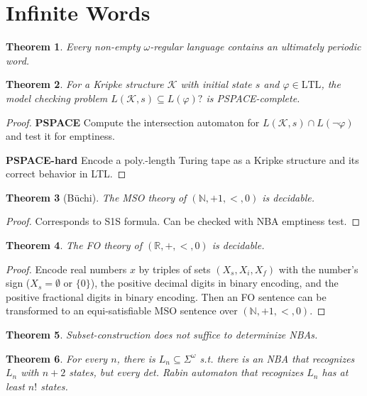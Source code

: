 \documentclass{article}
\newtheorem{theorem}{Theorem}[section]
\begin{document}
\section{Infinite Words}

\begin{theorem}
	Every non-empty $\omega$-regular language contains an ultimately periodic word.
\end{theorem}


\begin{theorem}
	For a Kripke structure $\mathcal{K}$ with initial state $s$ and $\varphi \in \text{LTL}$, the model checking problem $L(\mathcal{K}, s) \subseteq L(\varphi)?$ is PSPACE-complete.
\end{theorem}
\begin{proof}
	\textbf{PSPACE} Compute the intersection automaton for $L(\mathcal{K}, s) \cap L(\neg \varphi)$ and test it for emptiness.
	
	\textbf{PSPACE-hard} Encode a poly.-length Turing tape as a Kripke structure and its correct behavior in LTL.
\end{proof}

\begin{theorem}[Büchi]
	The MSO theory of $(\mathbb{N}, +1, <, 0)$ is decidable.
\end{theorem}
\begin{proof}
	Corresponds to S1S formula. Can be checked with NBA emptiness test.
\end{proof}

\begin{theorem}
	The FO theory of $(\mathbb{R}, +, <, 0)$ is decidable.
\end{theorem}
\begin{proof}
	Encode real numbers $x$ by triples of sets $(X_s, X_i, X_f)$ with the number's sign ($X_s = \emptyset$ or $\{0\}$), the positive decimal digits in binary encoding, and the positive fractional digits in binary encoding. Then an FO sentence can be transformed to an equi-satisfiable MSO sentence over $(\mathbb{N}, +1, <, 0)$.
\end{proof}

\begin{theorem}
	Subset-construction does not suffice to determinize NBAs.
\end{theorem}

\begin{theorem}
	For every $n$, there is $L_n \subseteq \Sigma^\omega$ s.t. there is an NBA that recognizes $L_n$ with $n+2$ states, but every det. Rabin automaton that recognizes $L_n$ has at least $n!$ states.
\end{theorem}
\end{document}
